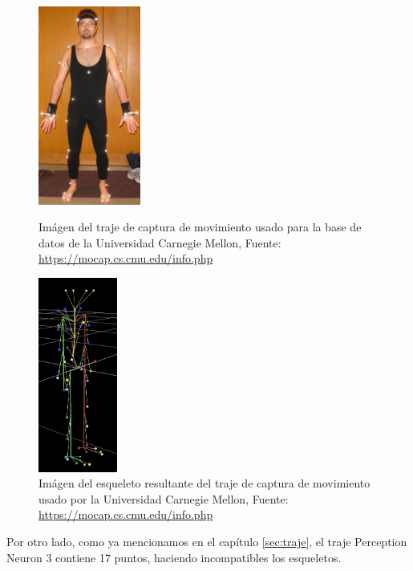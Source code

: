 \begin{figure}[H]
    \begin{minipage}[H]{0.4\linewidth}
        \centering
        \includegraphics[width=0.3\textwidth]{Imagenes/Bitmap/MCUTraje.jpg}
        \caption{Imágen del traje de captura de movimiento usado para la base de datos de la Universidad Carnegie Mellon, Fuente: \url{https://mocap.cs.cmu.edu/info.php}}
        \label{fig:MCUTraje}
    \end{minipage}
    \hfill
    \begin{minipage}[H]{0.6\linewidth}
        \centering
        \includegraphics[width=0.23\textwidth]{Imagenes/Bitmap/MCUEsqueleto.jpg}
        \caption{Imágen del esqueleto resultante del traje de captura de movimiento usado por la Universidad Carnegie Mellon, Fuente: \url{https://mocap.cs.cmu.edu/info.php}}
        \label{fig:MCUEsqueleto}
    \end{minipage}
\end{figure}

Por otro lado, como ya mencionamos en el capítulo \ref{sec:traje}, el traje Perception Neuron 3 contiene 17 puntos, haciendo incompatibles los esqueletos.

